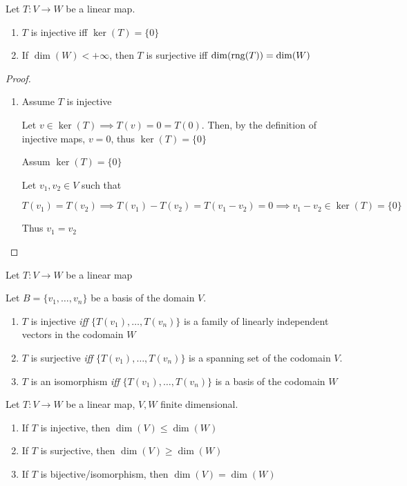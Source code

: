 \begin{theorem}
	Let $T: V \to W$ be a linear map.

	\begin{enumerate}
		\item $T$ is injective iff $\ker(T) = \{0\}$
		\item If $\dim(W) < +\infty$, then $T$ is surjective iff $\dim(\mathrm{rng}(T)) = \dim(W)$
	\end{enumerate}
\end{theorem}

\begin{proof}
	\begin{enumerate}
		\item Assume $T$ is injective
		
		Let $v \in \ker(T) \implies T(v) = 0 = T(0)$. Then, by the definition of injective maps, $v = 0$, thus $\ker(T) = \{0\}$

		Assum $\ker(T) = \{0\}$

		Let $v_1, v_2 \in V$ such that 
		
		\[T(v_1) = T(v_2) \implies T(v_1) - T(v_2) = T(v_1 - v_2) = 0 \implies v_1 - v_2 \in \ker(T) = \{0\}\]

		Thus $v_1 = v_2$
	\end{enumerate}
\end{proof}

\begin{theorem}
	Let $T: V \to W$ be a linear map

	Let $B = \{v_1, \ldots, v_n\}$ be a basis of the domain $V$.

	\begin{enumerate}
		\item $T$ is injective \textit{iff} $\{T(v_1), \ldots, T(v_n)\}$ is a family of linearly independent vectors in the codomain $W$
		\item $T$ is surjective \textit{iff} $\{T(v_1), \ldots, T(v_n)\}$ is a spanning set of the codomain $V$.
		\item $T$ is an isomorphism \textit{iff} $\{T(v_1), \ldots, T(v_n)\}$ is a basis of the codomain $W$
	\end{enumerate}
\end{theorem}

\begin{corollary}
	Let $T:V\to W$ be a linear map, $V, W$ finite dimensional.

	\begin{enumerate}
		\item If $T$ is injective, then $\dim(V) \leq \dim(W)$
		\item If $T$ is surjective, then $\dim(V) \geq \dim(W)$
		\item If $T$ is bijective/isomorphism, then $\dim(V) = \dim(W)$
	\end{enumerate}
\end{corollary}

